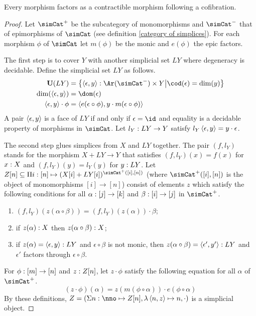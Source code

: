 \documentclass[csh.tex]{subfiles}
\begin{document}
\begin{proposition} Every morphism factors as a contractible morphism following a cofibration. \label{factor1} \end{proposition}

\begin{proof}
Let $\simCat^+$ be the subcategory of monomorphisms and $\simCat^-$ that of epimorphisms of $\simCat$ (see definition \ref{category of simplices}). For each morphism $\phi$ of $\simCat$ let $m(\phi)$ be the monic and $e(\phi)$ the epic factors.

The first step is to cover $Y$ with another simplicial set $LY$ where degeneracy is decidable. Define the simplicial set $LY$ as follows.
\begin{align*}
\base(LY) &= \set{\tuplet{\epsilon,y}\of \Ar(\simCat^-)\times Y\middle| \cod(\epsilon)=\dim(y)}\\
\dim(\tuplet{\epsilon,y}) &= \dom(\epsilon)\\
\tuplet{\epsilon,y}\cdot \phi &= \tuplet{e(\epsilon\circ \phi),y\cdot m(\epsilon\circ\phi)}
\end{align*}
A pair $\left\langle \epsilon,y \right\rangle$ is a face of $LY$ if and only if $\epsilon=\id$ and equality is a decidable property of morphisms in $\simCat$.
Let $l_Y: LY\to Y$ satisfy $l_Y\left\langle \epsilon,y \right\rangle=y\cdot\epsilon$.


The second step glues simplices from $X$ and $LY$ together.
The pair $(f,l_Y)$ stands for the morphism $X+LY\to Y$ that satisfies $(f,l_Y)(x)=f(x)$ for $x: X$ and $(f,l_Y)(y) = l_Y(y)$ for $y: LY$.
Let $Z[n]\subseteq \product{i\of[n]}{(X[i]+LY[i])^{\simCat^+([i],[n])}}$ (where $\simCat^+([i],[n])$ is the object of monomorphisms $[i]\to [n]$) consist of elements $z$ which satisfy the following conditions for all $\alpha: [j]\to [k]$ and $\beta: [i]\to[j]$ in $\simCat^+$.
\begin{enumerate}
\item $(f,l_Y)(z(\alpha\circ\beta)) = (f,l_Y)(z(\alpha))\cdot\beta$;
\item if $z(\alpha): X$ then $z(\alpha\circ\beta): X$;
\item if $z(\alpha)=\left\langle \epsilon,y \right\rangle: LY$ and $\epsilon\circ\beta$ is not monic, then $z(\alpha\circ\beta) = \left\langle \epsilon',y' \right\rangle: LY$ and $\epsilon'$ factors through $\epsilon\circ\beta$.
\end{enumerate}
For $\phi:[m]\to [n]$ and $z: Z[n]$, let $z\cdot\phi$ satisfy the following equation for all $\alpha$ of $\simCat^+$.
\[ (z\cdot\phi)(\alpha) = z(m(\phi\circ\alpha))\cdot e(\phi\circ \alpha) \]
By these definitions, $Z=(\coproduct{n\of\nno}{Z[n]},\function{\tuplet{n,z}}n,\cdot)$ is a simplicial object.


\end{proof}
\end{document}
